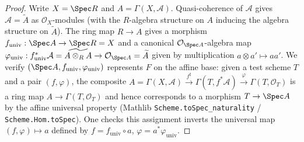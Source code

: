 \begin{proof}
  
  \leanok
  Write \(X = \Spec R\) and \(A = \Gamma(X, \mathcal{A})\). Quasi-coherence of
  \(\mathcal{A}\) gives \(\mathcal{A} = \widetilde{A}\) as \(\mathcal{O}_X\)-modules
  (with the \(R\)-algebra structure on \(A\) inducing the algebra structure on
  \(\widetilde A\)). The ring map \(R \to A\) gives a morphism
  \(f_{\mathrm{univ}} : \Spec A \to \Spec R = X\) and a canonical
  \(\mathcal{O}_{\Spec A}\)-algebra map
  $\varphi_{\mathrm{univ}} : f_{\mathrm{univ}}^* \mathcal{A} = \widetilde{A \otimes_R A}
  \to \mathcal{O}_{\Spec A} = \widetilde A$ given by multiplication
  \(a \otimes a' \mapsto aa'\). We verify \((\Spec A, f_{\mathrm{univ}}, \varphi_{\mathrm{univ}})\)
  represents \(F\) on the affine base: given a test scheme \(T\) and a pair
  \((f, \varphi)\), the composite
  $A = \Gamma(X, \mathcal{A}) \xrightarrow{f^\sharp}
  \Gamma(T, f^*\mathcal{A}) \xrightarrow{\varphi} \Gamma(T, \mathcal{O}_T)$
  is a ring map \(A \to \Gamma(T, \mathcal{O}_T)\) and hence corresponds to a morphism
  \(T \to \Spec A\) by the affine universal property
  (Mathlib \texttt{Scheme.toSpec\_naturality} /
  \texttt{Scheme.Hom.toSpec}). One checks this assignment inverts the universal map
  \((f, \varphi) \mapsto a\) defined by \(f = f_{\mathrm{univ}} \circ a\),
  \(\varphi = a^* \varphi_{\mathrm{univ}}\).
\end{proof}

